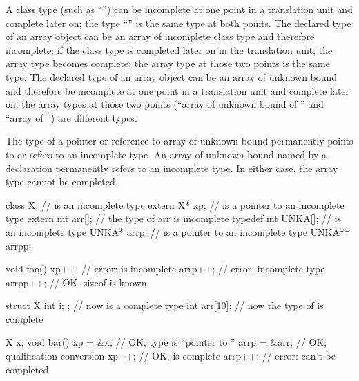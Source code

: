 \pnum
A class type (such as ``'') can be incomplete at one
point in a translation unit and complete later on; the type
``'' is the same type at both points. The declared type
of an array object can be an array of incomplete class type and
therefore incomplete; if the class type is completed later on in the
translation unit, the array type becomes complete; the array type at
those two points is the same type. The declared type of an array object
can be an array of unknown bound and therefore be incomplete at one
point in a translation unit and complete later on; the array types at
those two points (``array of unknown bound of '' and ``array of
 '') are different types.
\begin{note}
The type of a pointer or reference to array of unknown bound
permanently points to or refers to an incomplete type.
An array of unknown bound named by a  declaration
permanently refers to an incomplete type.
In either case, the array type cannot be completed.
\end{note}
\begin{example}
%
\begin{codeblock}
class X;                        //  is an incomplete type
extern X* xp;                   //  is a pointer to an incomplete type
extern int arr[];               // the type of arr is incomplete
typedef int UNKA[];             //  is an incomplete type
UNKA* arrp;                     //  is a pointer to an incomplete type
UNKA** arrpp;

void foo() {
  xp++;                         // error:  is incomplete
  arrp++;                       // error: incomplete type
  arrpp++;                      // OK, sizeof  is known
}

struct X { int i; };            // now  is a complete type
int arr[10];                    // now the type of  is complete

X x;
void bar() {
  xp = &x;                      // OK; type is ``pointer to ''
  arrp = &arr;                  // OK; qualification conversion
  xp++;                         // OK,  is complete
  arrp++;                       // error:  can't be completed
}
\end{codeblock}
\end{example}

